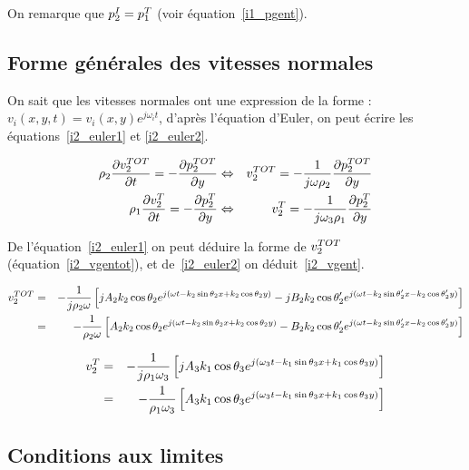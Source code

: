 On remarque que $p^I_2 = p^T_1$ (voir équation~\eqref{i1_pgent}).

\subsection{Forme générales des vitesses normales}

On sait que les vitesses normales ont une expression de la forme : $v_i(x,y,t) = v_i(x,y)e^{j\omega_it}$, d'après
l'équation d'Euler, on peut écrire les équations~\eqref{i2_euler1} et \eqref{i2_euler2}.

\begin{eqnarray}
    \rho_2\frac{\partial v^{TOT}_2}{\partial t} = -\frac{\partial p^{TOT}_2}{\partial y}
        & \Leftrightarrow & v^{TOT}_2 = -\frac{1}{j\omega\rho_2}\frac{\partial p^{TOT}_2}{\partial y}\label{i2_euler1} \\
    \rho_1\frac{\partial v^T_2}{\partial t} = -\frac{\partial p^T_2}{\partial y}
        & \Leftrightarrow & v^T_2 = -\frac{1}{j\omega_3\rho_1}\frac{\partial p^T_2}{\partial y}\label{i2_euler2}
\end{eqnarray}

De l'équation~\eqref{i2_euler1} on peut déduire la forme de $v^{TOT}_2$ (équation~\eqref{i2_vgentot}), et
de~\eqref{i2_euler2} on déduit~\eqref{i2_vgent}.

\begin{eqnarray}
    v^{TOT}_2
        & = & -\frac{1}{j\rho_2\omega}\left[ jA_2k_2\cos\theta_2e^{j(\omega t-k_2\sin\theta_2x+k_2\cos\theta_2y)} -
            jB_2k_2\cos\theta_2'e^{j(\omega t-k_2\sin\theta_2'x-k_2\cos\theta_2'y)}\right]\notag\\
        & = & -\frac{1}{\rho_2\omega}\left[ A_2k_2\cos\theta_2e^{j(\omega t-k_2\sin\theta_2x+k_2\cos\theta_2y)} -
            B_2k_2\cos\theta_2'e^{j(\omega t-k_2\sin\theta_2'x-k_2\cos\theta_2'y)}\right]\notag\\ \label{i2_vgentot}
\end{eqnarray}

\begin{eqnarray}
    v^T_2
        & = &
    -\frac{1}{j\rho_1\omega_3}\left[jA_3k_1\cos\theta_3e^{j(\omega_3t-k_1\sin\theta_3x+k_1\cos\theta_3y)}\right]\notag\\
        & = &
    -\frac{1}{\rho_1\omega_3}\left[A_3k_1\cos\theta_3e^{j(\omega_3t-k_1\sin\theta_3x+k_1\cos\theta_3y)}\right]
    \label{i2_vgent}
\end{eqnarray}

\subsection{Conditions aux limites}

